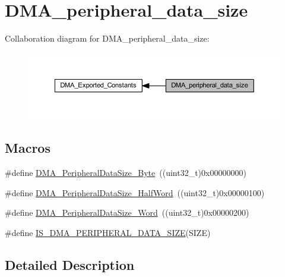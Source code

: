 \hypertarget{group___d_m_a__peripheral__data__size}{}\section{D\+M\+A\+\_\+peripheral\+\_\+data\+\_\+size}
\label{group___d_m_a__peripheral__data__size}
Collaboration diagram for D\+M\+A\+\_\+peripheral\+\_\+data\+\_\+size\+:
\nopagebreak
\begin{figure}[H]
\begin{center}
\leavevmode
\includegraphics[width=350pt]{group___d_m_a__peripheral__data__size}
\end{center}
\end{figure}
\subsection*{Macros}
\begin{DoxyCompactItemize}
\item 
\#define \hyperlink{group___d_m_a__peripheral__data__size_ga7577035ae4ff413164000227a8cea346}{D\+M\+A\+\_\+\+Peripheral\+Data\+Size\+\_\+\+Byte}~((uint32\+\_\+t)0x00000000)
\item 
\#define \hyperlink{group___d_m_a__peripheral__data__size_gab1988e5005ee65c261018f62866e4585}{D\+M\+A\+\_\+\+Peripheral\+Data\+Size\+\_\+\+Half\+Word}~((uint32\+\_\+t)0x00000100)
\item 
\#define \hyperlink{group___d_m_a__peripheral__data__size_ga516ea7a40945d8325fe73e079b245ea1}{D\+M\+A\+\_\+\+Peripheral\+Data\+Size\+\_\+\+Word}~((uint32\+\_\+t)0x00000200)
\item 
\#define \hyperlink{group___d_m_a__peripheral__data__size_gad7916e0ae55cdf5efdfa68a09a028037}{I\+S\+\_\+\+D\+M\+A\+\_\+\+P\+E\+R\+I\+P\+H\+E\+R\+A\+L\+\_\+\+D\+A\+T\+A\+\_\+\+S\+I\+ZE}(S\+I\+ZE)
\end{DoxyCompactItemize}


\subsection{Detailed Description}


